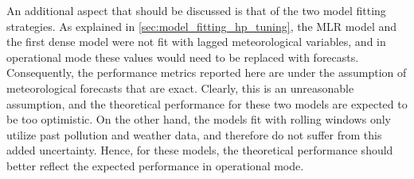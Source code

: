 An additional aspect that should be discussed is that of the two model fitting strategies. As explained in \cref{sec:model_fitting_hp_tuning}, the MLR model and the first dense model were not fit with lagged meteorological variables, and in operational mode these values would need to be replaced with forecasts. Consequently, the performance metrics reported here are under the assumption of meteorological forecasts that are exact. Clearly, this is an unreasonable assumption, and the theoretical performance for these two models are expected to be too optimistic. On the other hand, the models fit with rolling windows only utilize past pollution and weather data, and therefore do not suffer from this added uncertainty. Hence, for these models, the theoretical performance should better reflect the expected performance in operational mode. 



%








%
%
%

